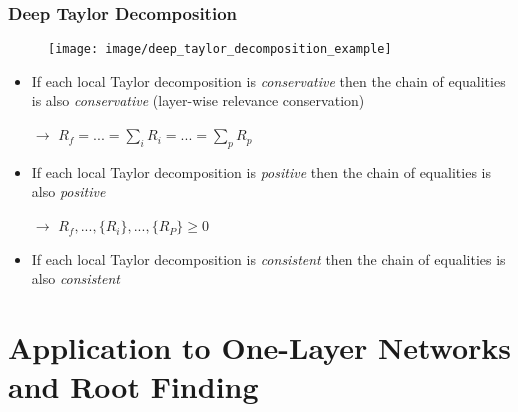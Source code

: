 \documentclass{beamer}
\begin{document}
\begin{frame}
\frametitle{Deep Taylor Decomposition}
\vspace{0.25cm}
\begin{figure}
\texttt{[image: image/deep\_taylor\_decomposition\_example]}
 \end{figure}

\begin{itemize}
\item  If each local Taylor decomposition is \textit{conservative} then the chain of equalities is also \textit{conservative} (layer-wise relevance conservation)
\item[$\rightarrow$] $R_f = ...= \sum_i R_i = ... = \sum_p R_p$
\item  If each local Taylor decomposition is \textit{positive} then the chain of equalities is also \textit{positive} 
\item[$\rightarrow$] $R_f,...,\{R_i\},...,\{R_P\} \geq 0$
\item If each local Taylor decomposition is \textit{consistent} then the chain of equalities is also \textit{consistent} 
\end{itemize}


\end{frame}

\section[One-Layer Networks]{Application to One-Layer Networks and Root Finding}
\end{document}
